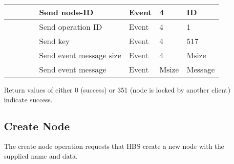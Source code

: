 \begin{tabular}{|p{1.2in}|p{.4in}|p{.4in}|p{.5in}|p{1.2in}|p{.4in}|p{.4in}|p{.5in} |}
                  &        &       &       & Send node-ID  & Event  &   4   &   ID    \\  \hline
                  &        &       &       & Send operation 
                                             ID           & Event  &   4   &  1   \\ \hline
                  &        &       &       & Send key     & Event  &   4   &  517    \\ \hline
                  &        &       &       & Send event message
                                                  size    & Event  &   4   &  Msize \\ \hline
                  &        &       &       & Send event message
                                                          & Event  &  Msize&  Message  \\ \hline
\end{tabular}
\normalsize
\bigskip

Return values of either 0 (success) or 351  (node is locked by another client) 
indicate success.



\newpage
\subsection{Create Node}

The create node operation requests that HBS create a new node with the
supplied name and data.

